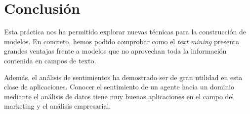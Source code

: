\documentclass[12pt]{report} %
\begin{document}
\chapter{Conclusión}
\label{chap:conclusion}

Esta práctica nos ha permitido explorar nuevas técnicas para la construcción de modelos. En concreto, hemos podido comprobar como el \textit{text mining} presenta grandes ventajas frente a modelos que no aprovechan toda la información contenida en campos de texto.

Además, el análisis de sentimientos ha demostrado ser de gran utilidad en esta clase de aplicaciones. Conocer el sentimiento de un agente hacia un dominio mediante el análisis de datos tiene muy buenas aplicaciones en el campo del marketing y el análisis empresarial.


\clearpage

{}
\label{chap:bibliography}
\printbibliography




\end{document}
